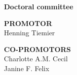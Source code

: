 
\clearpage
\thispagestyle{empty} 
\vspace*{1cm}  %
\textbf{Doctoral committee}

\vspace{1em}
\textbf{PROMOTOR}\\
\vspace{0.5em}
\hspace*{1cm}Henning Tiemier

\vspace{1em}
\textbf{CO-PROMOTORS}\\
\vspace{0.5em}
\hspace*{1cm}Charlotte A.M. Cecil\\
\vspace{0.5em}
\hspace*{1cm}Janine F. Felix
\clearpage